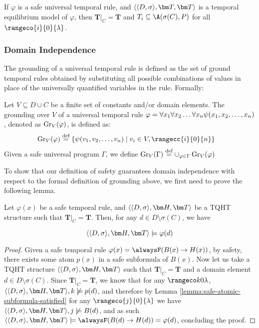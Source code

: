 \begin{theorem}
  If $\varphi$ is a safe universal temporal rule, and $\qttandt$ is a
  temporal equilibrium model of $\varphi$, then
  $\bm{T}\vert_{C}=\bm{T}$ and $T_i \subseteq \A(\sigma(C),P)$ for all
  $\rangeco{i}{0}{\lambda}$.
\end{theorem}

\subsubsection{Domain Independence}

The grounding of a universal temporal rule is defined as the set of
ground temporal rules obtained by substituting all possible
combinations of values in place of the universally quantified
variables in the rule. Formally:

\begin{definition}[Grounding]
  Let $V \subseteq D \cup C$ be a finite set of constants and/or
  domain elements. The grounding over $V$ of a universal temporal rule
  $\varphi = \forall x_1 \forall x_2 \dots \forall x_n \psi(x_1,x_2,\dots,x_n)$, denoted as
  $\operatorname{Gr}_{V}(\varphi)$, is defined as:
  \begin{align*}
    \ground{V}{\varphi} \defeq \{ &\psi(v_1,v_2,\dots,v_n) \mid v_i \in V, \rangecc{i}{0}{n}\}
  \end{align*}
  Given a safe universal program $\Gamma$, we define
  $\operatorname{Gr}_{V}(\Gamma) \stackrel{\text{def}}{=} \cup_{\varphi \in
    \Gamma}\operatorname{Gr}_{V}(\varphi)$
\end{definition}

To show that our definition of safety guarantees domain independence
with respect to the formal definition of grounding above, we first
need to prove the following lemma.

\begin{lemma}\label{lemma:not-imsigma-domain-sat}
  Let $\varphi(x)$ be a safe temporal rule, and $\qthandt$ be a
  TQHT structure such that $\bm{T}\vert_{C}=\bm{T}$. Then, for any
  $d \in D \setminus \sigma(C)$, we have

  \begin{equation*}
    \qthandt \models \varphi(d)
  \end{equation*}
  
\end{lemma}

\begin{proof}
  Given a safe temporal rule
  $\varphi(x) = \alwaysF(B(x) \rightarrow H(x))$, by safety, there
  exists some atom $p(x)$ in a safe subformula of $B(x)$. Now let us
  take a TQHT structure $\qthandt$ such that $\bm{T}\vert_{C}=\bm{T}$
  and a domain element $d \in D \setminus \sigma(C)$. Since
  $\bm{T}\vert_{C}=\bm{T}$, we know that for any $\kinlambda$,
  $\qthandt, k \not \models p(d)$, and therefore by Lemma
  \ref{lemma:safe-atomic-subformula-satisfied} for any
  $\rangeco{j}{0}{\lambda}$ we have $\qthandt,j \not \models B(d)$,
  and as such
  $\qthandt \models \alwaysF(B(d) \rightarrow H(d)) = \varphi(d)$,
  concluding the proof.
\end{proof}


